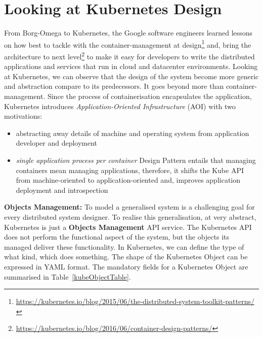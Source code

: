 \section{Looking at Kubernetes Design}
\label{kubeDesign}
From Borg-Omega to Kubernetes, the Google software engineers learned lessons\parencite{44843} on how best to tackle with the container-management at design\footnote{\url{https://kubernetes.io/blog/2015/06/the-distributed-system-toolkit-patterns/}} and, bring the architecture to next level\footnote{\url{https://kubernetes.io/blog/2016/06/container-design-patterns/}} to make it easy for developers to write the distributed applications and services that run in cloud and datacenter environments. Looking at Kubernetes, we can observe that the design of the system become more generic and abstraction compare to its predecessors. It goes beyond more than container-management. Since the process of containerisation encapsulates the application, Kubernetes introduces \textit{Application-Oriented Infrastructure} (AOI) with two motivations:
\begin{itemize}
\item abstracting away details of machine and operating system from application developer and deployment
\item \emph{single application process per container} Design Pattern entails that managing containers mean managing applications, therefore, it shifts the Kube API from machine-oriented to application-oriented and, improves application deployment and introspection 
\end{itemize}

\noindent\textbf{Objects Management:} \quad To model a generalised system is a challenging goal for every distributed system designer. To realise this generalisation, at very abstract, Kubernetes is just a \textbf{Objects Management} API service. The Kubernetes API does not perform the functional aspect of the system, but the objects its managed deliver these functionality. In Kubernetes, we can define the type of what kind, which does something. The shape of the Kubernetes Object can be expressed in YAML format. The mandatory fields for a Kubernetes Object are summarised in Table~\ref{kubeObjectTable}.

